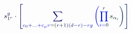 \documentclass[12pt]{article}
\begin{document}
\makeatletter
\renewcommand*{\@textcolor}[3]{%
  \protect\leavevmode
  \begingroup
    \color#1{#2}#3%
  \endgroup
}
\makeatother
\begin{displaymath}
\mathcolor[RGB]{0,0,15}{s} _ { \mathcolor[RGB]{0,0,30}{1} ^ { \mathcolor[RGB]{0,0,45}{r} } } ^ { \mathcolor[RGB]{0,0,60}{g} } \mathcolor[RGB]{0,0,75}{\cdot} \mathcolor[RGB]{0,0,90}{\left[} \mathcolor[RGB]{0,0,105}{\sum} _ { \mathcolor[RGB]{0,0,120}{c} _ { \mathcolor[RGB]{0,0,135}{0} } \mathcolor[RGB]{0,0,150}{+} \mathcolor[RGB]{0,0,165}{.} \mathcolor[RGB]{0,0,180}{.} \mathcolor[RGB]{0,0,195}{.} \mathcolor[RGB]{0,0,210}{+} \mathcolor[RGB]{0,0,225}{c} _ { \mathcolor[RGB]{0,0,240}{\mu} } \mathcolor[RGB]{0,0,255}{r} \mathcolor[RGB]{0,15,0}{=} \mathcolor[RGB]{0,15,15}{(} \mathcolor[RGB]{0,15,30}{r} \mathcolor[RGB]{0,15,45}{+} \mathcolor[RGB]{0,15,60}{1} \mathcolor[RGB]{0,15,75}{)} \mathcolor[RGB]{0,15,90}{(} \mathcolor[RGB]{0,15,105}{d} \mathcolor[RGB]{0,15,120}{-} \mathcolor[RGB]{0,15,135}{r} \mathcolor[RGB]{0,15,150}{)} \mathcolor[RGB]{0,15,165}{-} \mathcolor[RGB]{0,15,180}{r} \mathcolor[RGB]{0,15,195}{g} } \mathcolor[RGB]{0,15,210}{\left(} \mathcolor[RGB]{0,15,225}{\prod} _ { \mathcolor[RGB]{0,15,240}{i} \mathcolor[RGB]{0,15,255}{=} \mathcolor[RGB]{0,30,0}{0} } ^ { \mathcolor[RGB]{0,30,15}{r} } \mathcolor[RGB]{0,30,30}{s} _ { \mathcolor[RGB]{0,30,45}{\alpha} _ { \mathcolor[RGB]{0,30,60}{i} } } \mathcolor[RGB]{0,30,75}{\right)} \mathcolor[RGB]{0,30,90}{\right]}
\end{displaymath}
\end{document}
